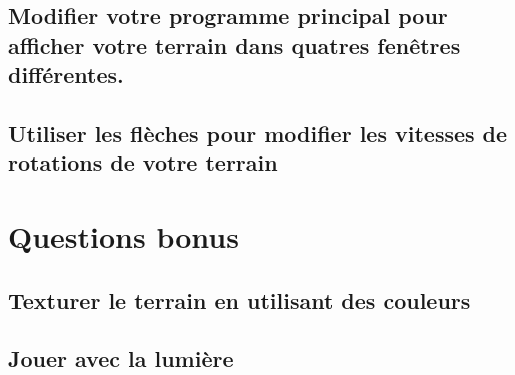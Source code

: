 \documentclass[a4paper,11pt]{report}
\begin{document}
	\subsection{Modifier votre programme principal pour afficher votre terrain dans quatres fenêtres différentes.}
	
	\subsection{Utiliser les flèches pour modifier les vitesses de rotations de votre terrain}
    
    \pagebreak
    \section{Questions bonus}
    \subsection{Texturer le terrain en utilisant des couleurs}
    
    \subsection{Jouer avec la lumière}
\end{document}
